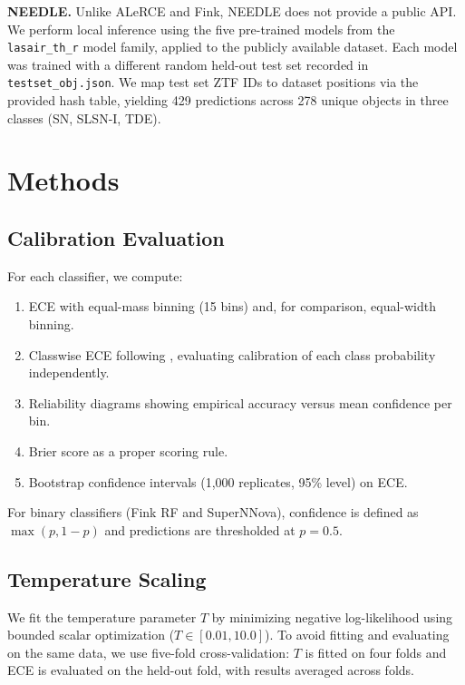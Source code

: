 \documentclass[twocolumn]{aastex631}
\begin{document}
\textbf{NEEDLE.} Unlike ALeRCE and Fink, NEEDLE \citep{sheng2024} does not provide a public API. We perform local inference using the five pre-trained models from the \texttt{lasair\_th\_r} model family, applied to the publicly available dataset. Each model was trained with a different random held-out test set recorded in \texttt{testset\_obj.json}. We map test set ZTF IDs to dataset positions via the provided hash table, yielding 429 predictions across 278 unique objects in three classes (SN, SLSN-I, TDE).


\section{Methods} \label{sec:methods}

\subsection{Calibration Evaluation}

For each classifier, we compute:
\begin{enumerate}
    \item ECE with equal-mass binning (15 bins) and, for comparison, equal-width binning.
    \item Classwise ECE following \citet{nixon2019}, evaluating calibration of each class probability independently.
    \item Reliability diagrams showing empirical accuracy versus mean confidence per bin.
    \item Brier score as a proper scoring rule.
    \item Bootstrap confidence intervals (1,000 replicates, 95\% level) on ECE.
\end{enumerate}

For binary classifiers (Fink RF and SuperNNova), confidence is defined as $\max(p, 1-p)$ and predictions are thresholded at $p = 0.5$.

\subsection{Temperature Scaling}

We fit the temperature parameter $T$ by minimizing negative log-likelihood using bounded scalar optimization ($T \in [0.01, 10.0]$). To avoid fitting and evaluating on the same data, we use five-fold cross-validation: $T$ is fitted on four folds and ECE is evaluated on the held-out fold, with results averaged across folds.
\end{document}
